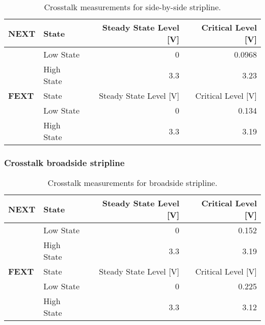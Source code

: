 \documentclass[../main.tex]{subfiles}
\begin{document}
\begin{table}[h]
    \centering
    \begin{tabular}{l l|r r}
        \toprule[1pt]
        \textbf{NEXT} & State & Steady State Level [V] & Critical Level [V] \\
        \midrule
        & Low State & 0 & 0.0968 \\
        & High State & 3.3 & 3.23 \\
        \midrule[1pt]
        \textbf{FEXT} & State & Steady State Level [V] & Critical Level [V] \\
        \midrule
        & Low State & 0 & 0.134 \\
        & High State & 3.3 & 3.19 \\
        \bottomrule[1pt]
    \end{tabular}
    \caption{Crosstalk measurements for side-by-side stripline.}
    \label{tab:meas-side-by-side-stripline2}
\end{table}

\subsubsection{Crosstalk broadside stripline}

\begin{table}[h]
    \centering
    \begin{tabular}{l l|r r}
        \toprule[1pt]
        \textbf{NEXT} & State & Steady State Level [V] & Critical Level [V] \\
        \midrule
        & Low State & 0 & 0.152 \\
        & High State & 3.3 & 3.19 \\
        \midrule[1pt]
        \textbf{FEXT} & State & Steady State Level [V] & Critical Level [V] \\
        \midrule
        & Low State & 0 & 0.225 \\
        & High State & 3.3 & 3.12 \\
        \bottomrule[1pt]
    \end{tabular}
    \caption{Crosstalk measurements for broadside stripline.}
    \label{tab:meas-broadside-stripline2}
\end{table}
\end{document}
